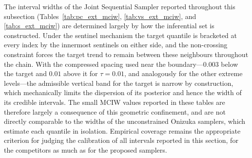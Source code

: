 The interval widths of the Joint Sequential Sampler reported throughout this subsection (Tables~\ref{tab:pc_ext_mciw}, \ref{tab:vs_ext_mciw}, and \ref{tab:s_ext_mciw}) are determined largely by how the inferential set is constructed. Under the sentinel mechanism the target quantile is bracketed at every index by the innermost sentinels on either side, and the non-crossing constraint forces the target trend to remain between these neighbours throughout the chain. With the compressed spacing used near the boundary---$0.003$ below the target and $0.01$ above it for $\tau = 0.01$, and analogously for the other extreme levels---the admissible vertical band for the target is narrow by construction, which mechanically limits the dispersion of its posterior and hence the width of its credible intervals. The small MCIW values reported in these tables are therefore largely a consequence of this geometric confinement, and are not directly comparable to the widths of the unconstrained Onizuka samplers, which estimate each quantile in isolation. Empirical coverage remains the appropriate criterion for judging the calibration of all intervals reported in this section, for the competitors as much as for the proposed samplers.
